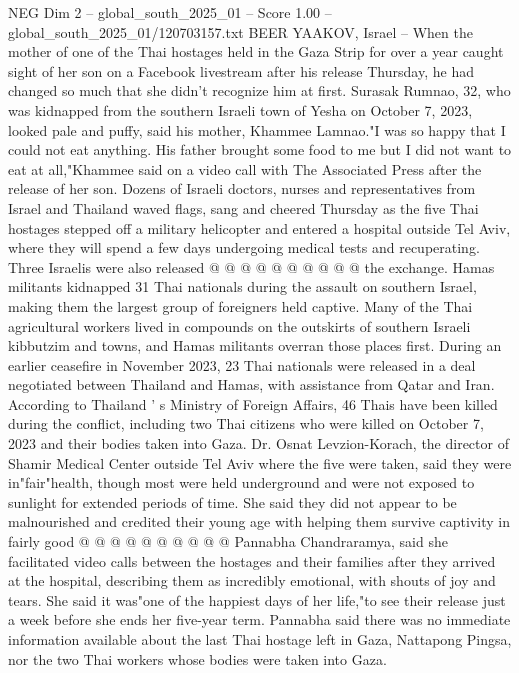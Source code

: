 \begin{textsample}{NEG Dim 2 – global\_south\_2025\_01 – Score 1.00 – global\_south\_2025\_01/120703157.txt}  \label{ex:f2_neg_115}
BEER YAAKOV, Israel -- When the mother of one of the Thai hostages held in the Gaza Strip for over a year caught sight of her son on a Facebook livestream after his release Thursday, he had changed so much that she didn't recognize him at first.
Surasak Rumnao, 32, who was kidnapped from the southern Israeli town of Yesha on October 7, 2023, looked pale and puffy, said his mother, Khammee Lamnao."I was so happy that I could not eat anything.
His father brought some food to me but I did not want to eat at all,"Khammee said on a video call with The Associated Press after the release of her son.
Dozens of Israeli doctors, nurses and representatives from Israel and Thailand waved flags, sang and cheered Thursday as the five Thai hostages stepped off a military helicopter and entered a hospital outside Tel Aviv, where they will spend a few days undergoing medical tests and recuperating.
Three Israelis were also released @ @ @ @ @ @ @ @ @ @ the exchange.
Hamas militants kidnapped 31 Thai nationals during the assault on southern Israel, making them the largest group of foreigners held captive.
Many of the Thai agricultural workers lived in compounds on the outskirts of southern Israeli kibbutzim and towns, and Hamas militants overran those places first.
During an earlier ceasefire in November 2023, 23 Thai nationals were released in a deal negotiated between Thailand and Hamas, with assistance from Qatar and Iran.
According to Thailand ' s Ministry of Foreign Affairs, 46 Thais have been killed during the conflict, including two Thai citizens who were killed on October 7, 2023 and their bodies taken into Gaza.
Dr.
Osnat Levzion-Korach, the director of Shamir Medical Center outside Tel Aviv where the five were taken, said they were in"fair"health, though most were held underground and were not exposed to sunlight for extended periods of time.
She said they did not appear to be malnourished and credited their young age with helping them survive captivity in fairly good @ @ @ @ @ @ @ @ @ @ Pannabha Chandraramya, said she facilitated video calls between the hostages and their families after they arrived at the hospital, describing them as incredibly emotional, with shouts of joy and tears.
She said it was"one of the happiest days of her life,"to see their release just a week before she ends her five-year term.
Pannabha said there was no immediate information available about the last Thai hostage left in Gaza, Nattapong Pingsa, nor the two Thai workers whose bodies were taken into Gaza.

\end{textsample}
